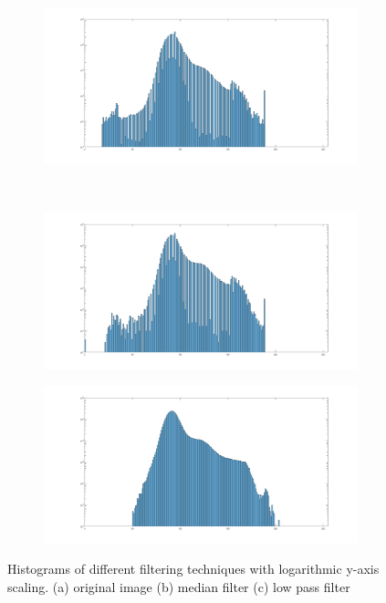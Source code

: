 \documentclass{article}
\begin{document}
\begin{figure}[H]
	\centering
	\begin{subfigure}[b]{0.45\textwidth}
		\includegraphics[width=\linewidth]{original_histo}
		\caption{}
		\label{fig:origNoFiltHist}
	\end{subfigure} 
	\\
	\begin{subfigure}[b]{0.45\textwidth}
		\includegraphics[width=\linewidth]{only_med_histo}
		\caption{}
		\label{fig:MedianFiltHist}
	\end{subfigure}
	\hspace{\fill}
	\begin{subfigure}[b]{0.45\textwidth}
		\includegraphics[width=\linewidth]{only_low_histo}
		\caption{}
		\label{fig:LowPassFiltHist}
	\end{subfigure}
	\captionsetup{justification=centering}
	\caption{Histograms of different filtering techniques with logarithmic y-axis scaling. 
		(a) original image
		(b) median filter
		(c) low pass filter}
	\label{fig:lowpassHisto1}
\end{figure}
\end{document}

